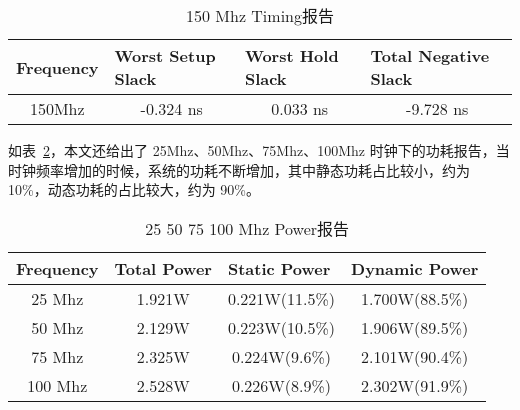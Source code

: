 \begin{table}[!htbp]
    \caption{150 Mhz Timing报告}
    \label{tab:150 Mhz Timing}
    \centering
    \footnotesize%
    \setlength{\tabcolsep}{4pt}%
    \renewcommand{\arraystretch}{1.2}%
    \begin{tabular}{llll}
        \toprule
        \textbf{Frequency}         & \textbf{Worst Setup Slack}    & \textbf{Worst Hold Slack}    & \textbf{Total Negative Slack} \\
        \midrule
        \multicolumn{1}{c}{150Mhz} & \multicolumn{1}{c}{-0.324 ns} & \multicolumn{1}{c}{0.033 ns} & \multicolumn{1}{c}{-9.728 ns} \\
        \bottomrule                   
    \end{tabular}
\end{table}

如表~\ref{tab:25-100 Mhz Power}，本文还给出了 25Mhz、50Mhz、75Mhz、100Mhz 时钟下的功耗报告，当时钟频率增加的时候，系统的功耗不断增加，其中静态功耗占比较小，约为 10\%，动态功耗的占比较大，约为 90\%。

\begin{table}[!htbp]
    \caption{25 50 75 100 Mhz Power报告}
    \label{tab:25-100 Mhz Power}
    \centering
    \footnotesize%
    \setlength{\tabcolsep}{4pt}%
    \renewcommand{\arraystretch}{1.2}%
    \begin{tabular}{cccc}
        \toprule
        \multicolumn{1}{l}{\textbf{Frequency}} & \multicolumn{1}{l}{\textbf{Total Power}} & \multicolumn{1}{l}{\textbf{Static Power}} & \multicolumn{1}{l}{\textbf{Dynamic Power}} \\
        \midrule
        25 Mhz                                 & 1.921W                                   & 0.221W(11.5\%)                            & 1.700W(88.5\%)                             \\
        50 Mhz                                 & 2.129W                                   & 0.223W(10.5\%)                            & 1.906W(89.5\%)                             \\
        75 Mhz                                 & 2.325W                                   & 0.224W(9.6\%)                             & 2.101W(90.4\%)                             \\
        100 Mhz                                & 2.528W                                   & 0.226W(8.9\%)                             & 2.302W(91.9\%)                             \\
        \bottomrule                   
    \end{tabular}
\end{table}

